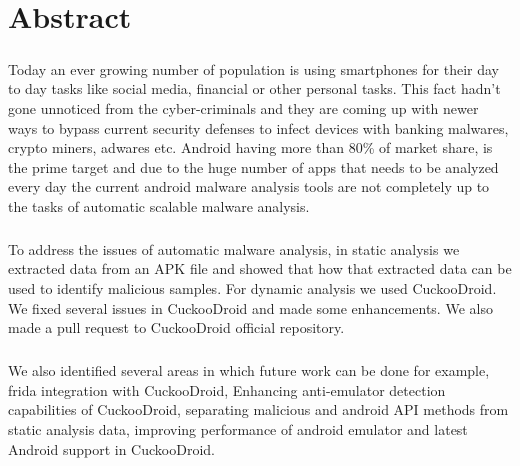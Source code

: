 \documentclass[../main.tex]{subfile}
\begin{document}
\chapter*{\centering Abstract}
	\paragraph{} Today an ever growing number of population is using smartphones for their day to day tasks like social media, financial or other personal tasks. This fact hadn't gone unnoticed from the cyber-criminals and they are coming up with newer ways to bypass current security defenses to infect devices with banking malwares, crypto miners, adwares etc. Android having more than 80\% of market share, is the prime target and due to the huge number of apps that needs to be analyzed every day the current android malware analysis tools are not completely up to the tasks of automatic scalable malware analysis.
	
	\paragraph{} To address the issues of automatic malware analysis, in static analysis we extracted data from an APK file and showed that how that extracted data can be used to identify malicious samples. For dynamic analysis we used CuckooDroid. We fixed several issues in CuckooDroid and made some enhancements. We also made a pull request to CuckooDroid official repository.
	
	\paragraph{} We also identified several areas in which future work can be done for example, frida integration with CuckooDroid, Enhancing anti-emulator detection capabilities of CuckooDroid, separating malicious and android API methods from static analysis data, improving performance of android emulator and latest Android support in CuckooDroid.
\end{document}
